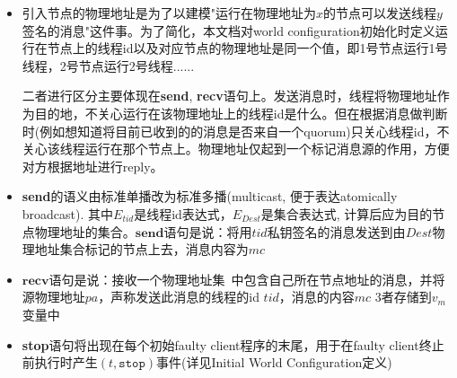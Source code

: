 \documentclass[UTF8, 8pt, a4paper ]{ctexart}
\begin{document}
\begin{small}
\begin{itemize}
		\item 引入节点的物理地址是为了以建模"运行在物理地址为$ x $的节点可以发送线程$ y $签名的消息"这件事。为了简化，本文档对world configuration初始化时定义运行在节点上的线程id以及对应节点的物理地址是同一个值，即1号节点运行1号线程，2号节点运行2号线程......
		
		二者进行区分主要体现在\textbf{send}, \textbf{recv}语句上。发送消息时，线程将物理地址作为目的地，不关心运行在该物理地址上的线程id是什么。但在根据消息做判断时(例如想知道将目前已收到的的消息是否来自一个quorum)只关心线程id，不关心该线程运行在那个节点上。物理地址仅起到一个标记消息源的作用，方便对方根据地址进行reply。
		
		\item \textbf{send}的语义由标准单播改为标准多播(multicast, 便于表达atomically broadcast). 其中$ E_\textit{tid} $是线程id表达式，$ E_\textit{Dest} $是集合表达式, 计算后应为目的节点物理地址的集合。$ \textbf{send} $语句是说：将用$ tid $私钥签名的消息发送到由$ \textit{Dest} $物理地址集合标记的节点上去，消息内容为$ mc $
		\item $ \textbf{recv} $语句是说：接收一个物理地址集\ 中包含自己所在节点地址的消息，并将源物理地址$ pa $，声称发送此消息的线程的id $ tid $，消息的内容$ mc $ 3者存储到$ v_m $变量中
		
		\item \textbf{stop}语句将出现在每个初始faulty client程序的末尾，用于在faulty client终止前执行时产生$ (t, \texttt{stop}) $事件(详见Initial World Configuration定义)
		
	\begin{comment}
		\item 下面定义一些全局函数
			\begin{itemize}
				\item 物理地址映射函数$ \ulcorner t \urcorner $，其中$ t $是线程id，$ \ulcorner t \urcorner $是运行线程$ t $的节点的物理地址，不同线程运行在不同节点上，且不可通过物理地址推算线程id
				\begin{kfomula}{0.2}
					\forall t_1, t_2.\ \ulcorner t_1 \urcorner = \ulcorner t_2 \urcorner \implies t_1 = t_2\\
					\red{\forall pa.\ \ulcorner pa \urcorner^{-1} \textit{ undefined }}
				\end{kfomula}
			
				
				\item 理想message digest 函数$ D: \textit{Msg} \rightharpoonup \textit{Nat} $满足无冲撞性和不可求逆性
					\begin{kfomula}{0.1}
						\forall m, m'.\ D(m) = D(m') \implies m = m' \\
						\red{\forall d.\ D^{-1}(d) \textit{ undefined }}
					\end{kfomula}
					

\end{comment}
\end{itemize}
\end{small}
\end{document}
